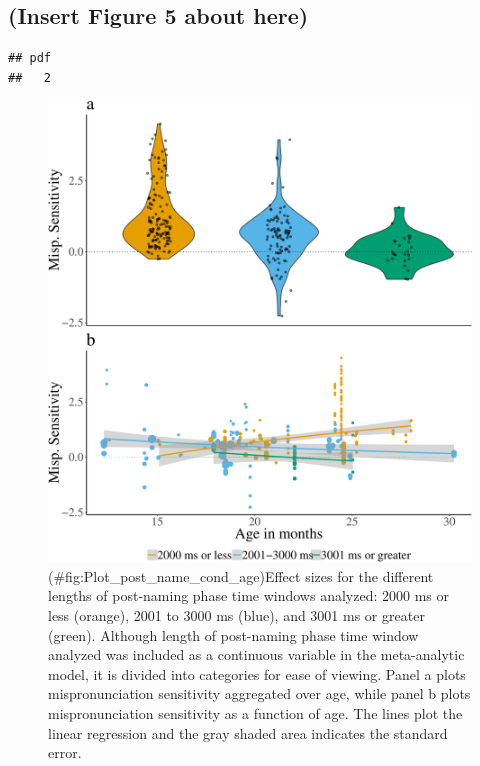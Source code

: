 \documentclass[man]{apa6}
\theoremstyle{definition}
\theoremstyle{definition}
\theoremstyle{definition}
\theoremstyle{remark}
\begin{document}
\subsection{(Insert Figure 5 about
here)}\label{insert-figure-5-about-here}

\begin{verbatim}
## pdf 
##   2
\end{verbatim}

\begin{figure}
\centering
\includegraphics{Paper_Analyses_files/figure-latex/Plot_post_name_cond_age-1.pdf}
\caption{(\#fig:Plot\_post\_name\_cond\_age)Effect sizes for the
different lengths of post-naming phase time windows analyzed: 2000 ms or
less (orange), 2001 to 3000 ms (blue), and 3001 ms or greater (green).
Although length of post-naming phase time window analyzed was included
as a continuous variable in the meta-analytic model, it is divided into
categories for ease of viewing. Panel a plots mispronunciation
sensitivity aggregated over age, while panel b plots mispronunciation
sensitivity as a function of age. The lines plot the linear regression
and the gray shaded area indicates the standard error.}
\end{figure}
\end{document}
